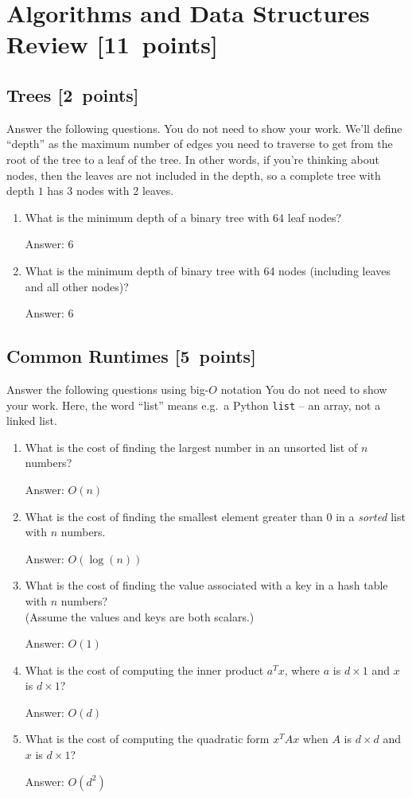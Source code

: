 \documentclass{article}
\newcommand{\blu}[1]{{\textcolor{blu}{#1}}}
\newcommand{\gre}[1]{\textcolor{gre}{#1}}
\newcommand\ans[1]{\par\gre{Answer: #1}}
\newenvironment{answer}{\par\begingroup\color{gre}Answer: }{\endgroup}
\let\ask\blu
\newcommand\pts[1]{\textcolor{pointscolour}{[#1~points]}}
\begin{document}
  \clearpage\section{Algorithms and Data Structures Review \pts{11}}

  \subsection{Trees \pts{2}}

  \ask{Answer the following questions.} You do not need to show your work. We'll define ``depth'' as the maximum number of edges you need to traverse to get from the root of the tree to a leaf of the tree. In other words, if you're thinking about nodes, then the leaves are not included in the depth, so a complete tree with depth $1$ has 3 nodes with 2 leaves.


  \begin{enumerate}
  \item What is the minimum depth of a binary tree with 64 leaf nodes?
  
  \begin{answer}
       6
  \end{answer}
  \item What is the minimum depth of binary tree with 64 nodes (including leaves and all other nodes)?
  \ans{6}
  \end{enumerate}

  \subsection{Common Runtimes \pts{5}}

  \ask{Answer the following questions using big-$O$ notation} You do not need to show your work.
  Here, the word ``list'' means e.g.\ a Python \texttt{list} -- an array, not a linked list.
  \begin{enumerate}
  \item What is the cost of finding the largest number in an unsorted list of $n$ numbers?
  \ans{$O(n)$}
  \item What is the cost of finding the smallest element greater than 0 in a \emph{sorted} list with $n$ numbers.
  \ans{$O(\log(n))$}
  \item What is the cost of finding the value associated with a key in a hash table with $n$ numbers? \\(Assume the values and keys are both scalars.)
  \ans{$O(1)$}
  \item What is the cost of computing the inner product $a^Tx$, where $a$ is $d \times 1$ and $x$ is $d \times 1$?
  \ans{$O(d)$}
  \item What is the cost of computing the quadratic form $x^TAx$ when $A$ is $d \times d$ and $x$ is $d \times 1$?
  \ans{$O(d^2)$}
  \end{enumerate}
\end{document}
